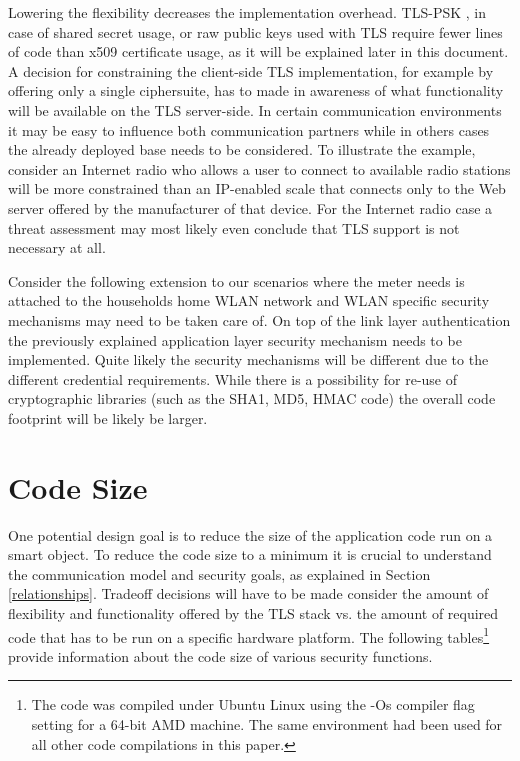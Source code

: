 \documentclass[a4paper, 10pt]{IEEEtran}
\begin{document}
Lowering the flexibility decreases the implementation overhead. TLS-PSK \cite{rfc4279}, in case of shared secret usage, or raw public keys used with TLS \cite{I-d.ietf-tls-oob-pubkey} require fewer lines of code than x509 certificate usage, as it will be explained later in this document. A decision for constraining the client-side TLS implementation, for example by offering only a single ciphersuite, has to made in awareness of what functionality will be available on the TLS server-side. In certain communication environments it may be easy to influence both communication partners while in others cases the already deployed base needs to be considered. To illustrate the example, consider an Internet radio who allows a user to connect to available radio stations will be more constrained than an IP-enabled scale that connects only to the Web server offered by the manufacturer of that device. For the Internet radio case a threat assessment may most likely even conclude that TLS support is not necessary at all. 

Consider the following extension to our scenarios where the meter needs is attached to the households home WLAN network and WLAN specific security mechanisms may need to be taken care of. On top of the link layer authentication the previously explained application layer security mechanism needs to be implemented. Quite likely the security mechanisms will be different due to the different credential requirements. While there is a possibility for re-use of cryptographic libraries (such as the SHA1, MD5, HMAC code) the overall code footprint will be likely be larger. 

\section{Code Size}

One potential design goal is to reduce the size of the application code run on a smart object. To reduce the code size to a minimum it is crucial to understand the communication model and security goals, as explained in Section \ref{relationships}. Tradeoff decisions will have to be made consider the amount of flexibility and functionality offered by the TLS stack vs. the amount of required code that has to be run on a specific hardware platform. The following tables\footnote{The code was compiled under Ubuntu Linux using the -Os compiler flag setting for a 64-bit AMD machine. The same environment had been used for all other code compilations in this paper.} provide information about the code size of various security functions. 
\end{document}
